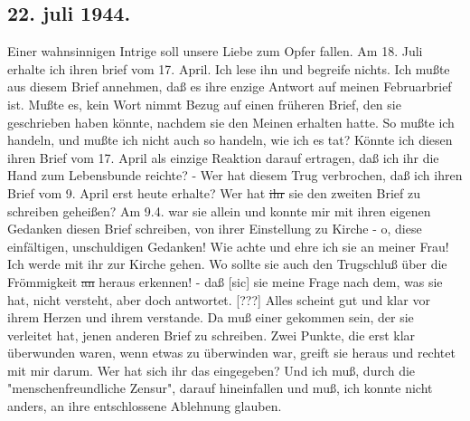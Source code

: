 \subsection{22. juli 1944.}

Einer wahnsinnigen Intrige soll unsere Liebe zum Opfer fallen.
Am 18. Juli erhalte ich ihren brief vom 17. April.
Ich lese ihn und begreife nichts.
Ich mu{\ss}te aus diesem Brief annehmen, da{\ss} es ihre enzige Antwort auf meinen Februarbrief ist.
Mu{\ss}te es, kein Wort nimmt Bezug auf einen fr\"{u}heren Brief, den sie geschrieben haben k\"{o}nnte, nachdem sie den Meinen erhalten hatte.
So mu{\ss}te ich handeln, und mu{\ss}te ich nicht auch so handeln, wie ich es tat?
K\"{o}nnte ich diesen ihren Brief vom 17. April als einzige Reaktion darauf ertragen, da{\ss} ich ihr die Hand zum Lebensbunde reichte? -
Wer hat diesem Trug verbrochen, da{\ss} ich ihren Brief vom 9. April erst heute erhalte?
Wer hat \st{ihr} sie den zweiten Brief zu schreiben gehei{\ss}en?
Am 9.4. war sie allein und konnte mir mit ihren eigenen Gedanken diesen Brief schreiben, von ihrer Einstellung zu Kirche - o, diese einf\"{a}ltigen, unschuldigen Gedanken!
Wie achte und ehre ich sie an meiner Frau!
Ich werde mit ihr zur Kirche gehen.
Wo sollte sie auch den Trugschlu{\ss} \"{u}ber die Fr\"{o}mmigkeit \st{an} heraus erkennen! -
da{\ss}{\color{red} [sic] sie meine Frage nach dem, was sie hat, nicht versteht, aber doch antwortet. [???] }
Alles scheint gut und klar vor ihrem Herzen und ihrem verstande.
Da mu{\ss} einer gekommen sein, der sie verleitet hat, jenen anderen Brief zu schreiben.
Zwei Punkte, die erst klar \"{u}berwunden waren, wenn etwas zu \"{u}berwinden war, greift sie heraus und rechtet mit mir darum.
Wer hat sich ihr das eingegeben?
Und ich mu{\ss}, durch die "menschenfreundliche Zensur", darauf hineinfallen und mu{\ss}, ich konnte nicht anders, an ihre entschlossene Ablehnung glauben.

\clearpage
